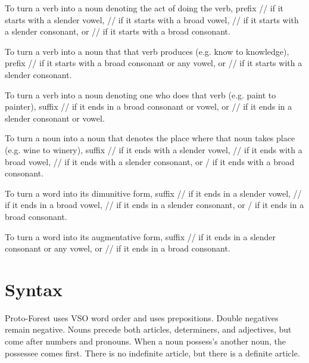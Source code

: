 \documentclass{article}
\begin{document}
To turn a verb into a noun denoting the act of doing the verb, prefix // if it starts with a slender vowel, // if it starts with a broad vowel, // if it starts with a slender consonant, or // if it starts with a broad consonant.

To turn a verb into a noun that that verb produces (e.g. know to knowledge), prefix // if it starts with a broad consonant or any vowel, or // if it starts with a slender consonant.

To turn a verb into a noun denoting one who does that verb (e.g. paint to painter), suffix // if it ends in a broad consonant or vowel, or // if it ends in a slender consonant or vowel.

To turn a noun into a noun that denotes the place where that noun takes place (e.g. wine to winery), suffix // if it ends with a slender vowel, // if it ends with a broad vowel, // if it ends with a slender consonant, or / if it ends with a broad consonant.

To turn a word into its dimunitive form, suffix // if it ends in a slender vowel, // if it ends in a broad vowel, // if it ends in a slender consonant, or / if it ends in a broad consonant.

To turn a word into its augmentative form, suffix // if it ends in a slender consonant or any vowel, or // if it ends in a broad consonant.
\newpage
\part{Syntax}
Proto-Forest uses VSO word order and uses prepositions. Double negatives remain negative. Nouns precede both articles, determiners, and adjectives, but come after numbers and pronouns. When a noun possess's another noun, the possessee comes first. There is no indefinite article, but there is a definite article.
\newpage
\end{document}
